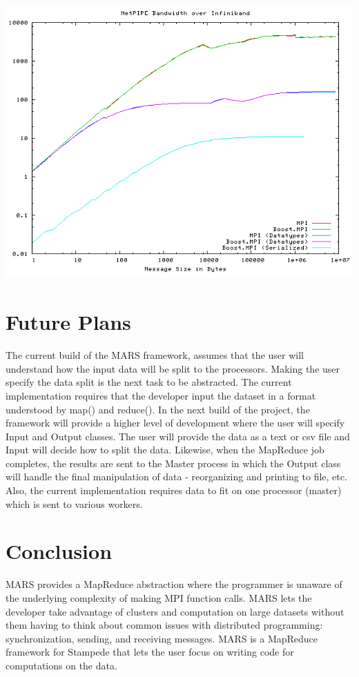 \documentclass[11pt]{article}
\begin{document}
\hspace{-.2em}\includegraphics[scale=0.6]{boost_performance}

\section{Future Plans}
The current build of the MARS framework, assumes that the user will understand how the input data will be split to the processors. Making the user specify the data split is the next task to be abstracted. The current implementation requires that the developer input the dataset in a format understood by map() and reduce(). In the next build of the project, the framework will provide a higher level of development where the user will specify Input and Output classes. The user will provide the data as a text or csv file and Input will decide how to split the data. Likewise, when the MapReduce job completes, the results are sent to the Master process in which the Output class will handle the final manipulation of data - reorganizing and printing to file, etc. Also, the current implementation requires data to fit on one processor (master) which is sent to various  workers.

\section{Conclusion}
MARS provides a MapReduce abstraction where the programmer is unaware of the underlying complexity of making MPI function calls. MARS lets the developer take advantage of clusters and computation on large datasets without them having to think about common issues with distributed programming: synchronization, sending, and receiving messages. MARS is a MapReduce framework for Stampede that lets the user focus on writing code for computations on the data.
\end{document}

